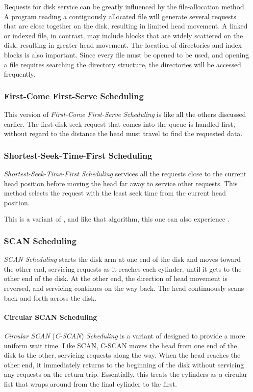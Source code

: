 Requests for disk service can be greatly influenced by the file-allocation method.
A program reading a contiguously allocated file will generate several requests that are close together on the disk, resulting in limited head movement.
A linked or indexed file, in contrast, may include blocks that are widely scattered on the disk, resulting in greater head movement.
The location of directories and index blocks is also important.
Since every file must be opened to be used, and opening a file requires searching the directory structure, the directories will be accessed frequently.

\subsubsection{First-Come First-Serve Scheduling}\label{subsubsec:FCFS_Disk_Scheduling}
This version of \emph{First-Come First-Serve Scheduling} is like all the others discussed earlier.
The first disk seek request that comes into the queue is handled first, without regard to the distance the head must travel to find the requested data.

\subsubsection{Shortest-Seek-Time-First Scheduling}\label{subsubsec:SSTF_Disk_Scheduling}
\emph{Shortest-Seek-Time-First Scheduling} services all the requests close to the current head position before moving the head far away to service other requests.
This method selects the request with the least seek time from the current head position.

This is a variant of , and like that algorithm, this one can also experience .

\subsubsection{SCAN Scheduling}\label{subsubsec:SCAN_Disk_Scheduling}
\emph{SCAN Scheduling} starts the disk arm at one end of the disk and moves toward the other end, servicing requests as it reaches each cylinder, until it gets to the other end of the disk.
At the other end, the direction of head movement is reversed, and servicing continues on the way back.
The head continuously scans back and forth across the disk.

\paragraph{Circular SCAN Scheduling}\label{par:Circular_SCAN_Disk_Scheduling}
\emph{Circular SCAN} (\emph{C-SCAN}) \emph{Scheduling} is a variant of  designed to provide a more uniform wait time.
Like SCAN, C-SCAN moves the head from one end of the disk to the other, servicing requests along the way.
When the head reaches the other end, it immediately returns to the beginning of the disk without servicing any requests on the return trip.
Essentially, this treats the cylinders as a circular list that wraps around from the final cylinder to the first.



